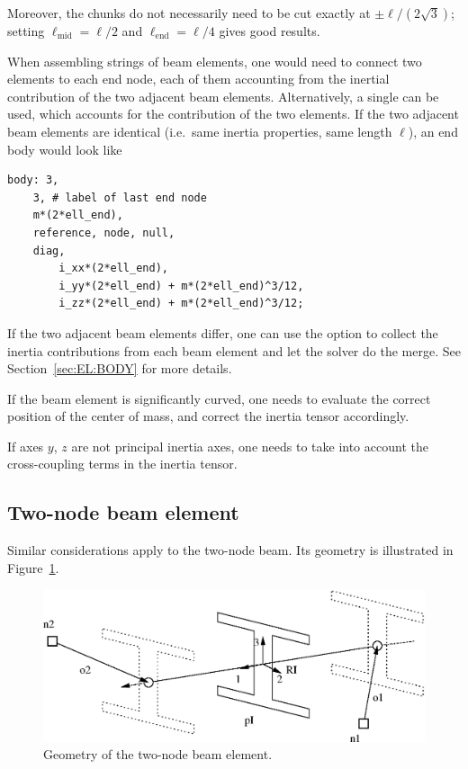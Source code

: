 Moreover, the chunks do not necessarily need to be cut exactly at $\pm \ell / (2 \sqrt{3})$;
setting $\ell_{\text{mid}} = \ell/2$ and $\ell_{\text{end}} = \ell/4$ gives good results.

When assembling strings of beam elements, one would need to connect two  elements to each end node,
each of them accounting from the inertial contribution of the two adjacent beam elements.
Alternatively, a single  can be used, which accounts for the contribution of the two elements.
If the two adjacent beam elements are identical (i.e.\ same inertia properties, same length $\ell$),
an end body would look like
\begin{verbatim}
body: 3,
    3, # label of last end node
    m*(2*ell_end),
    reference, node, null,
    diag,
        i_xx*(2*ell_end),
        i_yy*(2*ell_end) + m*(2*ell_end)^3/12,
        i_zz*(2*ell_end) + m*(2*ell_end)^3/12;
\end{verbatim}
If the two adjacent beam elements differ, one can use the  option
to collect the inertia contributions from each beam element and let the solver
do the merge.
See Section~\ref{sec:EL:BODY} for more details.

If the beam element is significantly curved, one needs to evaluate the correct position of the center of mass,
and correct the inertia tensor accordingly.

If axes $y$, $z$ are not principal inertia axes, one needs to take into account the cross-coupling terms in the inertia tensor.





\subsection{Two-node beam element}
\label{sec:EL:BEAM:BEAM2}
Similar considerations apply to the two-node beam.
Its geometry is illustrated in Figure~\ref{fig:EL:BEAM:beam2}.

\begin{figure}
\centering
{}
\includegraphics[width=.7\textwidth]{beam2}
\caption{Geometry of the two-node beam element.}
\label{fig:EL:BEAM:beam2}
\end{figure}

